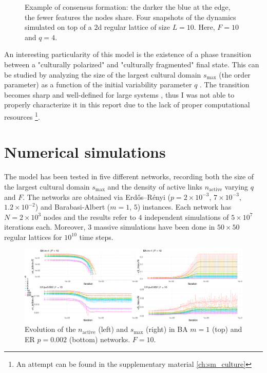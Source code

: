 \begin{figure}[h]
\begin{minipage}{0.25\textwidth}
    \end{minipage}
    \vspace{-0.5cm}
    \caption{Example of consensus formation: the darker the blue at the edge, the fewer features the nodes share. Four snapshots of the dynamics simulated on top of a $2$d regular lattice of size $L=10$. Here, $F=10$ and $q=4$.}
    \label{fig:figures}
\end{figure}

\noindent An interesting particularity of this model is the existence of a phase transition between a "culturally polarized" and "culturally fragmented" final state. This can be studied by analyzing the size of the largest cultural domain $s_{\text{max}}$ (the order parameter) as a function of the initial variability parameter $q$ \cite{castellano2000nonequilibrium, miguel2005binary}. The transition becomes sharp and well-defined for large systems \cite{miguel2005binary}, thus I was not able to properly characterize it in this report due to the lack of proper computational resources \footnote{An attempt can be found in the supplementary material \ref{ch:sm_culture}}.

\vspace{-0.1cm}
\section{Numerical simulations}
The model has been tested in five different networks, recording both the size of the largest cultural domain $s_\text{max}$ and the density of active links $n_\text{active}$ varying $q$ and $F$. The networks are obtained via Erdős–Rényi ($p=2\times10^{-3}$, $7\times10^{-3}$, $1.2\times10^{-2}$) and Barabasi-Albert ($m=1$, $5$) instances. Each network has $N=2\times10^3$ nodes and the results refer to $4$ independent simulations of $5\times10^7$ iterations each. Moreover, $3$ massive simulations have been done in $50\times 50$ regular lattices for $10^{10}$ time steps. \\

\vspace{-0.1cm}
\begin{figure}[h] 
    \centering
    \includegraphics[width=1\textwidth]{images/task30/ba-er.png} 
    \vspace{-0.5cm}
    \caption{Evolution of the $n_\text{active}$ (left) and  $s_\text{max}$ (right) in BA $m=1$ (top) and ER $p=0.002$ (bottom) networks. $F=10$.}
    \label{fig:culture1} 
\end{figure}

